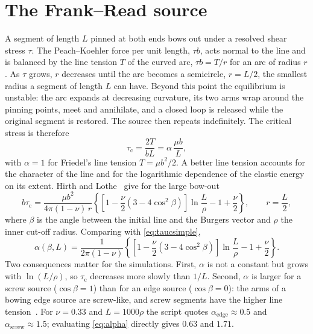 \documentclass[11pt,a4paper]{article}
\numberwithin{equation}{section}
\theoremstyle{remark}
\newcommand{\tauc}{\tau_{\mathrm{c}}}
\begin{document}
\section{The Frank--Read source}\label{sec:fr}

A segment of length $L$ pinned at both ends bows out under a resolved shear stress $\tau$. The
Peach--Koehler force per unit length, $\tau b$, acts normal to the line and is balanced by the line
tension $T$ of the curved arc, $\tau b = T/r$ for an arc of radius $r$. As $\tau$ grows, $r$ decreases
until the arc becomes a semicircle, $r = L/2$, the smallest radius a segment of length $L$ can have.
Beyond this point the equilibrium is unstable: the arc expands at decreasing curvature, its two arms
wrap around the pinning points, meet and annihilate, and a closed loop is released while the original
segment is restored. The source then repeats indefinitely. The critical stress is therefore
\begin{equation}\label{eq:taucsimple}
  \tauc = \frac{2T}{bL} = \alpha\,\frac{\mu b}{L},
\end{equation}
with $\alpha = 1$ for Friedel's line tension $T = \mu b^2/2$. A better line tension accounts for the
character of the line and for the logarithmic dependence of the elastic energy on its extent. Hirth and
Lothe~\citep{hirth1982} give for the large bow-out
\begin{equation}\label{eq:hirth}
  b\tauc = \frac{\mu b^2}{4\pi(1-\nu)\,r}
  \left\{\left[1 - \frac{\nu}{2}\left(3 - 4\cos^2\beta\right)\right]\ln\frac{L}{\rho} - 1 + \frac{\nu}{2}\right\},
  \qquad r = \frac{L}{2},
\end{equation}
where $\beta$ is the angle between the initial line and the Burgers vector and $\rho$ the inner cut-off
radius. Comparing with \cref{eq:taucsimple},
\begin{equation}\label{eq:alpha}
  \alpha(\beta, L) = \frac{1}{2\pi(1-\nu)}
  \left\{\left[1 - \frac{\nu}{2}\left(3 - 4\cos^2\beta\right)\right]\ln\frac{L}{\rho} - 1 + \frac{\nu}{2}\right\}.
\end{equation}
Two consequences matter for the simulations. First, $\alpha$ is not a constant but grows with
$\ln(L/\rho)$, so $\tauc$ decreases more slowly than $1/L$. Second, $\alpha$ is larger for a screw
source ($\cos\beta = 1$) than for an edge source ($\cos\beta = 0$): the arms of a bowing edge source are
screw-like, and screw segments have the higher line tension~\citep{anderson2017}. For $\nu = 0.33$ and
$L = 1000\rho$ the script quotes $\alpha_{\mathrm{edge}} \approx 0.5$ and
$\alpha_{\mathrm{screw}} \approx 1.5$; evaluating \cref{eq:alpha} directly gives $0.63$ and $1.71$.
\end{document}
